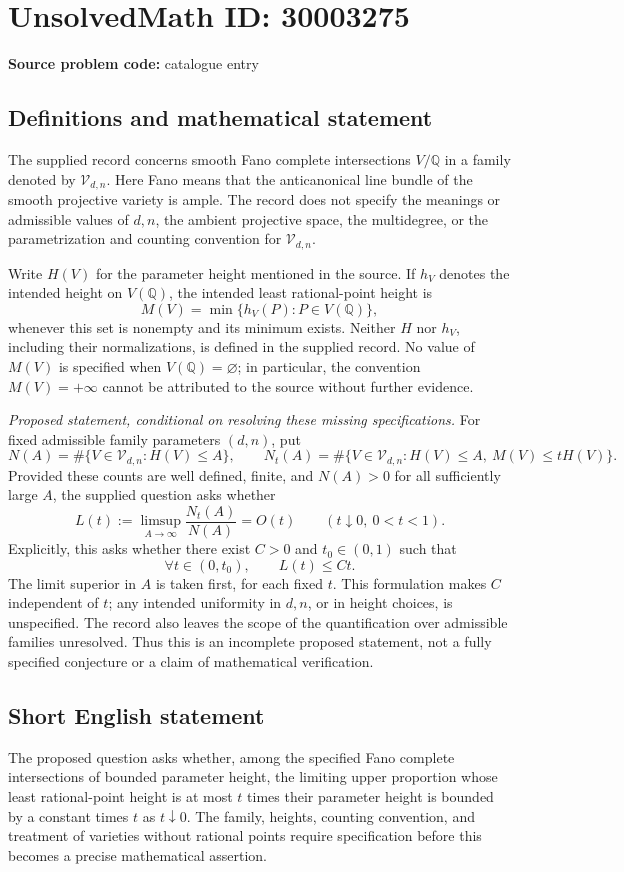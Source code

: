 \documentclass[11pt]{article}
\newcommand{\Q}{\mathbb{Q}}
\begin{document}
\section*{UnsolvedMath ID: 30003275}
\textbf{Source problem code:} catalogue entry
\subsection{Definitions and mathematical statement}
The supplied record concerns smooth Fano complete intersections \(V/\Q\) in a family denoted by \(\mathcal V_{d,n}\). Here Fano means that the anticanonical line bundle of the smooth projective variety is ample. The record does not specify the meanings or admissible values of \(d,n\), the ambient projective space, the multidegree, or the parametrization and counting convention for \(\mathcal V_{d,n}\).

Write \(H(V)\) for the parameter height mentioned in the source. If \(h_V\) denotes the intended height on \(V(\Q)\), the intended least rational-point height is
\[
M(V)=\min\{h_V(P):P\in V(\Q)\},
\]
whenever this set is nonempty and its minimum exists. Neither \(H\) nor \(h_V\), including their normalizations, is defined in the supplied record. No value of \(M(V)\) is specified when \(V(\Q)=\varnothing\); in particular, the convention \(M(V)=+\infty\) cannot be attributed to the source without further evidence.

\emph{Proposed statement, conditional on resolving these missing specifications.} For fixed admissible family parameters \((d,n)\), put
\[
N(A)=\#\{V\in\mathcal V_{d,n}:H(V)\leq A\},
\qquad
N_t(A)=\#\{V\in\mathcal V_{d,n}:H(V)\leq A,\ M(V)\leq tH(V)\}.
\]
Provided these counts are well defined, finite, and \(N(A)>0\) for all sufficiently large \(A\), the supplied question asks whether
\[
L(t):=\limsup_{A\to\infty}\frac{N_t(A)}{N(A)}=O(t)
\qquad(t\downarrow0,\ 0<t<1).
\]
Explicitly, this asks whether there exist \(C>0\) and \(t_0\in(0,1)\) such that
\[
\forall t\in(0,t_0),\qquad L(t)\leq Ct.
\]
The limit superior in \(A\) is taken first, for each fixed \(t\). This formulation makes \(C\) independent of \(t\); any intended uniformity in \(d,n\), or in height choices, is unspecified. The record also leaves the scope of the quantification over admissible families unresolved. Thus this is an incomplete proposed statement, not a fully specified conjecture or a claim of mathematical verification.
\subsection{Short English statement}
The proposed question asks whether, among the specified Fano complete intersections of bounded parameter height, the limiting upper proportion whose least rational-point height is at most \(t\) times their parameter height is bounded by a constant times \(t\) as \(t\downarrow0\). The family, heights, counting convention, and treatment of varieties without rational points require specification before this becomes a precise mathematical assertion.
\end{document}
